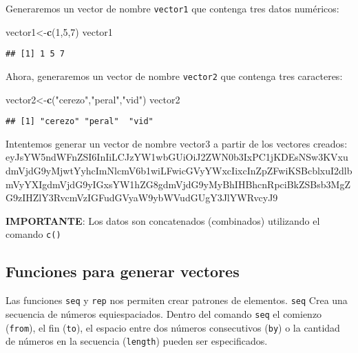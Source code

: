 \documentclass[]{book}
\newenvironment{Shaded}{\begin{snugshade}}{\end{snugshade}}
\newcommand{\DecValTok}[1]{\textcolor[rgb]{0.00,0.00,0.81}{#1}}
\newcommand{\KeywordTok}[1]{\textcolor[rgb]{0.13,0.29,0.53}{\textbf{#1}}}
\newcommand{\NormalTok}[1]{#1}
\newcommand{\StringTok}[1]{\textcolor[rgb]{0.31,0.60,0.02}{#1}}
\begin{document}
Generaremos un vector de nombre \texttt{vector1} que contenga tres datos numéricos:

\begin{Shaded}
\begin{Highlighting}[]
\NormalTok{vector1<-}\KeywordTok{c}\NormalTok{(}\DecValTok{1}\NormalTok{,}\DecValTok{5}\NormalTok{,}\DecValTok{7}\NormalTok{)}
\NormalTok{vector1}
\end{Highlighting}
\end{Shaded}

\begin{verbatim}
## [1] 1 5 7
\end{verbatim}

Ahora, generaremos un vector de nombre \texttt{vector2} que contenga tres caracteres:

\begin{Shaded}
\begin{Highlighting}[]
\NormalTok{vector2<-}\KeywordTok{c}\NormalTok{(}\StringTok{"cerezo"}\NormalTok{,}\StringTok{"peral"}\NormalTok{,}\StringTok{"vid"}\NormalTok{) }
\NormalTok{vector2   }
\end{Highlighting}
\end{Shaded}

\begin{verbatim}
## [1] "cerezo" "peral"  "vid"
\end{verbatim}

Intentemos generar un vector de nombre vector3 a partir de los vectores creados:\\

eyJsYW5ndWFnZSI6InIiLCJzYW1wbGUiOiJ2ZWN0b3IxPC1jKDEsNSw3KVxudmVjdG9yMjwtYyhcImNlcmV6b1wiLFwicGVyYWxcIixcInZpZFwiKSBcblxuI2dlbmVyYXIgdmVjdG9yIGxsYW1hZG8gdmVjdG9yMyBhIHBhcnRpciBkZSBsb3MgZG9zIHZlY3RvcmVzIGFudGVyaW9ybWVudGUgY3JlYWRvcyJ9

\textbf{IMPORTANTE}: Los datos son concatenados (combinados) utilizando el comando \texttt{c()}

\hypertarget{funciones-para-generar-vectores}{%
\subsection{Funciones para generar vectores}\label{funciones-para-generar-vectores}}

Las funciones \texttt{seq} y \texttt{rep} nos permiten crear patrones de elementos. \texttt{seq} Crea una secuencia de números equiespaciados. Dentro del comando \texttt{seq} el comienzo (\texttt{from}), el fin (\texttt{to}), el espacio entre dos números consecutivos (\texttt{by}) o la cantidad de números en la secuencia (\texttt{length}) pueden ser especificados.
\end{document}
